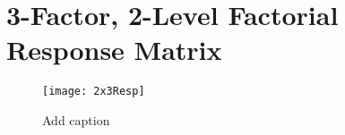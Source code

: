 \chapter{3-Factor, 2-Level Factorial Response Matrix} 
\begin{sidewaysfigure}
	\begin{center}
		\texttt{[image: 2x3Resp]}
	\end{center}
	\caption{Add caption}
\end{sidewaysfigure}

\cleardoublepage